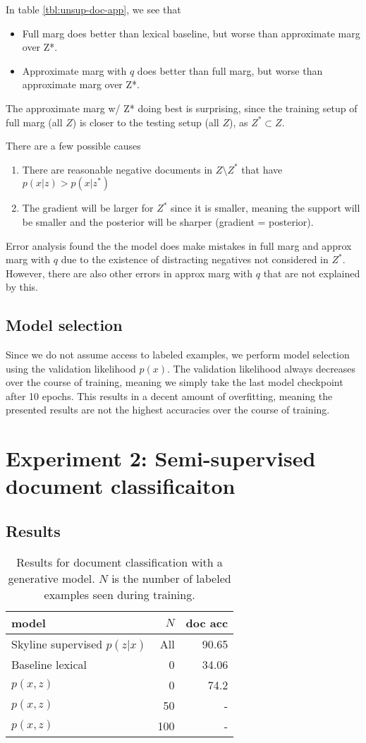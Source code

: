 \documentclass[11pt]{article}
\begin{document}
In table \ref{tbl:unsup-doc-app}, we see that
\begin{itemize}
\item Full marg does better than lexical baseline, but worse than approximate marg over Z*.
\item Approximate marg with $q$ does better than full marg, but worse than approximate marg over Z*.
\end{itemize}
The approximate marg w/ Z* doing best is surprising,
since the training setup of full marg (all $Z$) is closer to the testing setup (all $Z$),
as $Z^*\subset Z$.

There are a few possible causes
\begin{enumerate}
\item There are reasonable negative documents in $Z \setminus Z^*$ that have $p(x|z) > p(x|z^*)$
\item The gradient will be larger for $Z^*$ since it is smaller, meaning the support will be smaller
    and the posterior will be sharper (gradient = posterior).
\end{enumerate}
Error analysis found the the model does make mistakes in full marg and approx marg with $q$
due to the existence of distracting negatives not considered in $Z^*$.
However, there are also other errors in approx marg with $q$ that are not explained by this.

\subsection{Model selection}
Since we do not assume access to labeled examples, we perform model selection using the
validation likelihood $p(x)$.
The validation likelihood always decreases over the course of training,
meaning we simply take the last model checkpoint after 10 epochs.
This results in a decent amount of overfitting, meaning the presented results are not the
highest accuracies over the course of training.

\section{Experiment 2: Semi-supervised document classificaiton}



\subsection{Results}
\begin{table}
\centering
\begin{tabular}{lrr}
\toprule
model & $N$ & doc acc\\
\midrule
Skyline supervised $p(z|x)$ & All & 90.65\\
Baseline lexical & 0 & 34.06\\
$p(x,z)$ & 0 & 74.2\\
$p(x,z)$ & 50 & -\\
$p(x,z)$ & 100 & -\\
\bottomrule
\end{tabular}
\caption{
\label{tbl:semisup-doc}
Results for document classification with a generative model.
$N$ is the number of labeled examples seen during training.}
\end{table}
\end{document}
